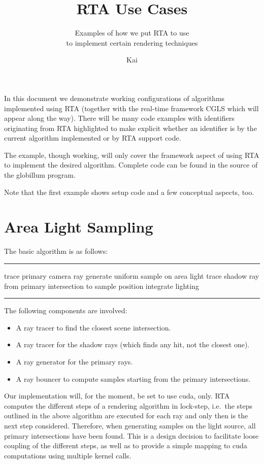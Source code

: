 \documentclass[a4paper,11pt]{scrartcl}
\title{RTA Use Cases}
\subtitle{Examples of how we put RTA to use \\to implement certain rendering techniques}
\author{Kai}
\newenvironment{alg}{
	\medskip\hrule
	\begin{algorithmic}}
	{\end{algorithmic}
	\hrule\medskip}
\begin{document}
\maketitle\thispagestyle{empty}

In this document we demonstrate working configurations of algorithms implemented using RTA 
	(together with the real-time framework CGLS which will appear along the way).
There will be many code examples with identifiers originating from RTA highlighted 
	to make explicit whether an identifier is by the current algorithm implemented or by RTA support code.

The example, though working, will only cover the framework aspect of using RTA to implement the desired algorithm.
Complete code can be found in the source of the globillum program.

Note that the first example shows setup code and a few conceptual aspects, too.

\setcounter{tocdepth}{2}
\tableofcontents

\clearpage
\section{Area Light Sampling}
The basic algorithm is as follows:

\begin{alg}
\State trace primary camera ray
	\State generate uniform sample on area light
	\State trace shadow ray from primary intersection to sample position
	\State integrate lighting
\EndFor
\end{alg}

The following components are involved:
\begin{itemize}
\item A ray tracer to find the closest scene intersection.
\item A ray tracer for the shadow rays (which finds any hit, not the closest one).
\item A ray generator for the primary rays.
\item A ray bouncer to compute samples starting from the primary intersections.
\end{itemize}

Our implementation will, for the moment, be set to use cuda, only.
RTA computes the different steps of a rendering algorithm in lock-step, 
	i.e.\ the steps outlined in the above algorithm are executed for each ray and only then is the next step considered.
Therefore, when generating samples on the light source, all primary intersections have been found.
This is a design decision to facilitate loose coupling of the different steps, 
	as well as to provide a simple mapping to cuda computations using multiple kernel calls.
\end{document}
